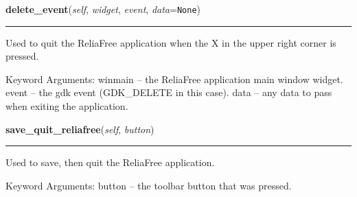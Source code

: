     \vspace{0.5ex}

\hspace{.8\funcindent}\begin{boxedminipage}{\funcwidth}

    \raggedright \textbf{delete\_event}(\textit{self}, \textit{widget}, \textit{event}, \textit{data}={\tt None})

    \vspace{-1.5ex}

    \rule{\textwidth}{0.5\fboxrule}
\setlength{\parskip}{2ex}
    Used to quit the ReliaFree application when the X in the upper right 
    corner is pressed.

    Keyword Arguments: winmain -- the ReliaFree application main window 
    widget. event   -- the gdk event (GDK\_DELETE in this case). data    --
    any data to pass when exiting the application.

\setlength{\parskip}{1ex}
    \end{boxedminipage}

    \label{reliafree:tree:TreeWindow:save_quit_reliafree}

    \vspace{0.5ex}

\hspace{.8\funcindent}\begin{boxedminipage}{\funcwidth}

    \raggedright \textbf{save\_quit\_reliafree}(\textit{self}, \textit{button})

    \vspace{-1.5ex}

    \rule{\textwidth}{0.5\fboxrule}
\setlength{\parskip}{2ex}
    Used to save, then quit the ReliaFree application.

    Keyword Arguments: button -- the toolbar button that was pressed.

\setlength{\parskip}{1ex}
    \end{boxedminipage}

    \label{reliafree:tree:TreeWindow:quit_reliafree}

    \vspace{0.5ex}

